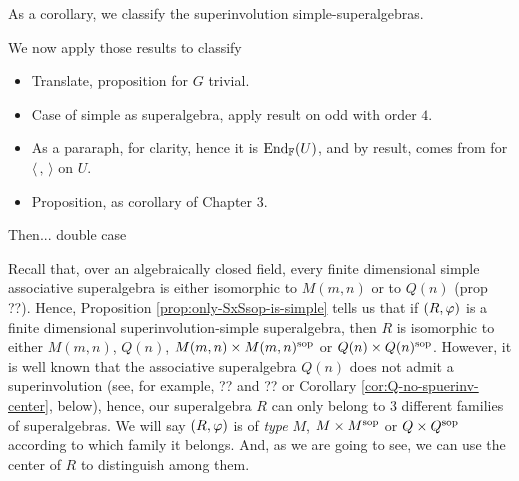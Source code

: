 


As a corollary, we classify the superinvolution simple-superalgebras. 

We now apply those results to classify 

\begin{itemize}
    \item Translate, proposition for $G$ trivial.
    \item Case of simple as superalgebra, apply result on odd with order $4$.
    \item As a pararaph, for clarity, hence it is $\operatorname{End}_{\mathbb{F}} (U)$, and by result, comes from for $\langle \, , \, \rangle$ on $U$.
    \item Proposition, as corollary of Chapter 3.
\end{itemize}

Then... double case

Recall that, over an algebraically closed field, every finite dimensional simple associative superalgebra is either isomorphic to $M(m,n)$ or to $Q(n)$ (prop ??).
Hence, Proposition \ref{prop:only-SxSsop-is-simple} tells us that if $(R, \varphi)$ is a  finite dimensional superinvolution-simple superalgebra, then $R$ is isomorphic to either $M(m,n)$, $Q(n)$, $M(m,n) \times M(m,n)^{\mathrm{sop}}$ or $Q(n) \times Q(n)^{\mathrm{sop}}$.
However, it is well known that the associative superalgebra $Q(n)$ does not admit a superinvolution (see, for example, ?? and ?? or Corollary \ref{cor:Q-no-spuerinv-center}, below),
hence, our superalgebra $R$ can only belong to 3 different families of superalgebras.
We will say $(R,\varphi)$ is of \emph{type} $M$, $M\times M^{\mathrm{sop}}$ or $Q\times Q^{\mathrm{sop}}$ according to which family it belongs.
And, as we are going to see, we can use the center of $R$ to distinguish among them.

